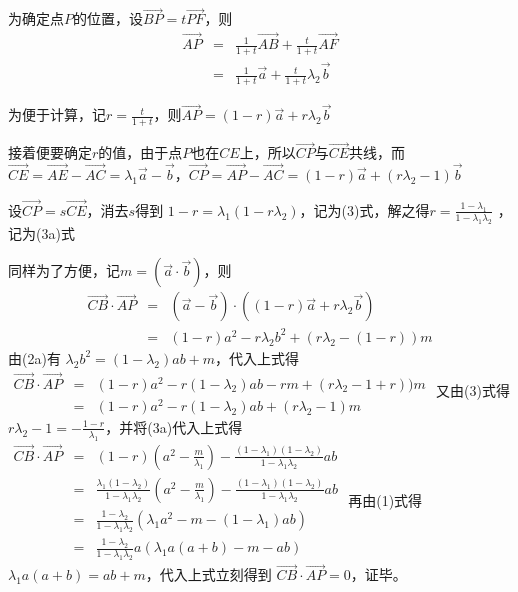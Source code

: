 为确定点$P$的位置，设$\overrightarrow{B P} = t \overrightarrow{P F}$，则
\begin{align}
\overrightarrow{A P} & = & \frac{1}{1 + t} \overrightarrow{A B} + \frac{t}{1 + t} \overrightarrow{A F} \\
& = & \frac{1}{1 + t} \vec{a} + \frac{t}{1 + t} \lambda_2 \vec{b}
\end{align}

为便于计算，记$r = \frac{t}{1 + t}$，则$\overrightarrow{A P} = (1 - r) \vec{a} + r \lambda_2 \vec{b}$ 

接着便要确定$r$的值，由于点$P$也在$C E$上，所以$\overrightarrow{C P}$与$\overrightarrow{C E}$共线，而 $\overrightarrow{C E} = \overrightarrow{A E} - \overrightarrow{A C} = \lambda_1 \vec{a} - \vec{b}$，$\overrightarrow{C P} = \overrightarrow{A P} - \overrightarrow{A C} = (1 - r) \vec{a} + (r \lambda_2 - 1) \vec{b}$

设$\overrightarrow{C P} = s \overrightarrow{C E}$，消去$s$得到 $1 - r = \lambda_1 (1 - r \lambda_2)$，记为(3)式，解之得$r = \frac{1 - \lambda_1}{1 - \lambda_1 \lambda_2}$ ，记为(3a)式

同样为了方便，记$m = (\vec{a} \cdot \vec{b})$，则
\begin{eqnarray*}
  \overrightarrow{C B} \cdot \overrightarrow{A P} & = & (\vec{a} - \vec{b})
  \cdot ((1 - r) \vec{a} + r \lambda_2 \vec{b})\\
  & = & (1 - r) a^2 - r \lambda_2 b^2 + (r \lambda_2 - (1 - r)) m
\end{eqnarray*}
由(2a)有 $\lambda_2 b^2 = (1 - \lambda_2) a b + m$，代入上式得
$\begin{array}{lll}
  \overrightarrow{C B} \cdot \overrightarrow{A P} & = & (1 - r) a^2 - r (1 -
  \lambda_2) a b - r m + (r \lambda_2 -  1 + r)) m\\
  & = & (1 - r) a^2 - r (1 - \lambda_2) a b + (r \lambda_2 -  1) m
  
\end{array}$
又由(3)式得$r \lambda_2 - 1 = - \frac{1 -
r}{\lambda_1}$，并将(3a)代入上式得
$\begin{array}{lll}
  \overrightarrow{C B} \cdot \overrightarrow{A P} & = & (1 - r) \left( a^2 -
  \frac{m}{\lambda_1} \right) - \frac{(1 - \lambda_1) (1 - \lambda_2)}{1 -
  \lambda_1 \lambda_2} a b\\
  & = & \frac{\lambda_1 (1 - \lambda_2)}{1 - \lambda_1 \lambda_2} \left( a^2
  - \frac{m}{\lambda_1} \right) - \frac{(1 - \lambda_1) (1 - \lambda_2)}{1 -
  \lambda_1 \lambda_2} a b\\
  & = & \frac{1 - \lambda_2}{1 - \lambda_1 \lambda_2} (\lambda_1 a^2 - m - (1
  - \lambda_1) a b)\\
  & = & \frac{1 - \lambda_2}{1 - \lambda_1 \lambda_2} a (\lambda_1 a (a + b)
  - m - a b)
\end{array}$
再由(1)式得$\lambda_1 a (a + b) = a b + m$，代入上式立刻得到
$\overrightarrow{C B} \cdot \overrightarrow{A P} = 0$，证毕。





